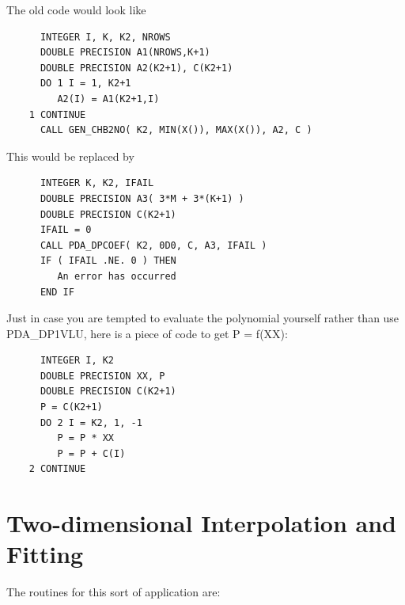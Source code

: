 \documentclass[11pt,twoside]{article}
\newcommand{\htmlref}[2]{#1}
\newcommand{\xlabel}[1]{}
\begin{document}
   The old code would look like

\begin{verbatim}
      INTEGER I, K, K2, NROWS
      DOUBLE PRECISION A1(NROWS,K+1)
      DOUBLE PRECISION A2(K2+1), C(K2+1)
      DO 1 I = 1, K2+1
         A2(I) = A1(K2+1,I)
    1 CONTINUE
      CALL GEN_CHB2NO( K2, MIN(X()), MAX(X()), A2, C )
\end{verbatim}

   This would be replaced by

\begin{verbatim}
      INTEGER K, K2, IFAIL
      DOUBLE PRECISION A3( 3*M + 3*(K+1) )
      DOUBLE PRECISION C(K2+1)
      IFAIL = 0
      CALL PDA_DPCOEF( K2, 0D0, C, A3, IFAIL )
      IF ( IFAIL .NE. 0 ) THEN
         An error has occurred
      END IF
\end{verbatim}

   Just in case you are tempted to evaluate the polynomial yourself
   rather than use
\htmlref{PDA\_DP1VLU,}{PDA\_DP1VLU}
   here is a piece of code to get P = f(XX):

\begin{verbatim}
      INTEGER I, K2
      DOUBLE PRECISION XX, P
      DOUBLE PRECISION C(K2+1)
      P = C(K2+1)
      DO 2 I = K2, 1, -1
         P = P * XX
         P = P + C(I)
    2 CONTINUE
\end{verbatim}

\section{\xlabel{two-dimensional_interpolation_and_fitting}Two-dimensional
Interpolation and Fitting}

The routines for this sort of application are:
\end{document}
